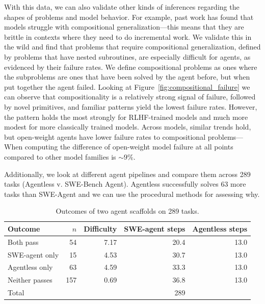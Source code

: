 \documentclass[11pt]{article}
\begin{document}
With this data, we can also validate other kinds of inferences regarding the shapes of problems and model behavior. For example, past work has found that models struggle with compositional generalization---this means that they are brittle in contexts where they need to do incremental work. We validate this in the wild and find that problems that require compositional generalization, defined by problems that have nested subroutines, are especially difficult for agents, as evidenced by their failure rates. We define compositional problems as ones where the subproblems are ones that have been solved by the agent before, but when put together the agent failed. Looking at Figure~\ref{fig:compositional_failure} we can observe that compositionality is a relatively strong signal of failure, followed by novel primitives, and familiar patterns yield the lowest failure rates. However, the pattern holds the most strongly for RLHF-trained models and much more modest for more classically trained models. Across models, similar trends hold, but open-weight agents have lower failure rates to compositional problems---When computing the difference of open-weight model failure at all points compared to other model families is ${\sim}9\%$.

Additionally, we look at different agent pipelines and compare them across 289 tasks (Agentless v. SWE-Bench Agent). Agentless successfully solves 63 more tasks than SWE-Agent and we can use the procedural methods for assessing why.

  \begin{table}[t]
  \centering\small
  \begin{tabular}{lrrrr}
  \toprule
  \textbf{Outcome} & \textbf{$n$} & \textbf{Difficulty}
    & \textbf{SWE-agent steps} & \textbf{Agentless steps} \\
  \midrule
  Both pass       &  54 & 7.17 & 20.4 & 13.0 \\
  SWE-agent only  &  15 & 4.53 & 30.7 & 13.0 \\
  Agentless only  &  63 & 4.59 & 33.3 & 13.0 \\
  Neither passes  & 157 & 0.69 & 36.8 & 13.0 \\
  \midrule
  \multicolumn{2}{l}{Total} & & 289 \\
  \bottomrule
  \end{tabular}
  \caption{Outcomes of two agent scaffolds on 289 tasks.}
\label{tab:scaffold_outcomes}
  \end{table}
\end{document}
